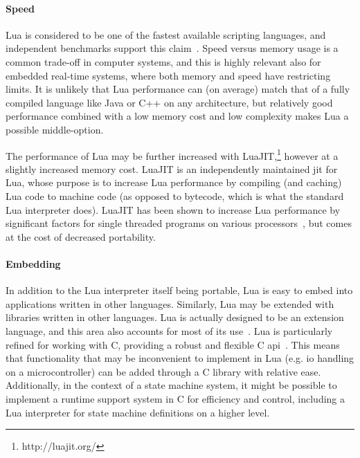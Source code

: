\paragraph{Speed}
Lua is considered to be one of the fastest available scripting languages, and independent benchmarks support this claim~\cite{website:computer_language_benchmarks_game}. Speed versus memory usage is a common trade-off in computer systems, and this is highly relevant also for embedded real-time systems, where both memory and speed have restricting limits. It is unlikely that Lua performance can (on average) match that of a fully compiled language like Java or C++ on any architecture, but relatively good performance combined with a low memory cost and low complexity makes Lua a possible middle-option.

\noindent
The performance of Lua may be further increased with LuaJIT,\footnote{http://luajit.org/} however at a slightly increased memory cost. LuaJIT is an independently maintained \gls{jit} for Lua, whose purpose is to increase Lua performance by compiling (and caching) Lua code to machine code (as opposed to bytecode, which is what the standard Lua interpreter does). LuaJIT has been shown to increase Lua performance by significant factors for single threaded programs on various processors~\cite{website:luajit_performance}, but comes at the cost of decreased portability.

\paragraph{Embedding}
In addition to the Lua interpreter itself being portable, Lua is easy to embed into applications written in other languages. Similarly, Lua may be extended with libraries written in other languages. Lua is actually designed to be an extension language, and this area also accounts for most of its use~\cite{website:where_lua_is_used}. Lua is particularly refined for working with C, providing a robust and flexible C \gls{api}~\cite[Ch. 24]{book:programming_in_lua_first}. This means that functionality that may be inconvenient to implement in Lua (e.g. \gls{io} handling on a microcontroller) can be added through a C library with relative ease. Additionally, in the context of a state machine system, it might be possible to implement a runtime support system in C for efficiency and control, including a Lua interpreter for state machine definitions on a higher level.

